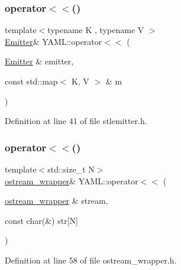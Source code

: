 \subsubsection{\texorpdfstring{operator$<$$<$()}{operator<<()}\hspace{0.1cm}{\footnotesize\ttfamily [8/35]}}
{\footnotesize\ttfamily template$<$typename K , typename V $>$ \\
\mbox{\hyperlink{class_y_a_m_l_1_1_emitter}{Emitter}}\& Y\+A\+M\+L\+::operator$<$$<$ (\begin{DoxyParamCaption}\item[{\mbox{\hyperlink{class_y_a_m_l_1_1_emitter}{Emitter}} \&}]{emitter,  }\item[{const std\+::map$<$ K, V $>$ \&}]{m }\end{DoxyParamCaption})\hspace{0.3cm}{\ttfamily [inline]}}



Definition at line 41 of file stlemitter.\+h.

\mbox{\label{namespace_y_a_m_l_a1806970a1c87cb0e184a6901d234a453}} 
\subsubsection{\texorpdfstring{operator$<$$<$()}{operator<<()}\hspace{0.1cm}{\footnotesize\ttfamily [9/35]}}
{\footnotesize\ttfamily template$<$std\+::size\+\_\+t N$>$ \\
\mbox{\hyperlink{class_y_a_m_l_1_1ostream__wrapper}{ostream\+\_\+wrapper}}\& Y\+A\+M\+L\+::operator$<$$<$ (\begin{DoxyParamCaption}\item[{\mbox{\hyperlink{class_y_a_m_l_1_1ostream__wrapper}{ostream\+\_\+wrapper}} \&}]{stream,  }\item[{const char(\&)}]{str\mbox{[}\+N\mbox{]} }\end{DoxyParamCaption})\hspace{0.3cm}{\ttfamily [inline]}}



Definition at line 58 of file ostream\+\_\+wrapper.\+h.

\mbox{\label{namespace_y_a_m_l_af403c1cea3db6d0f608514ff4fa903f3}} 
